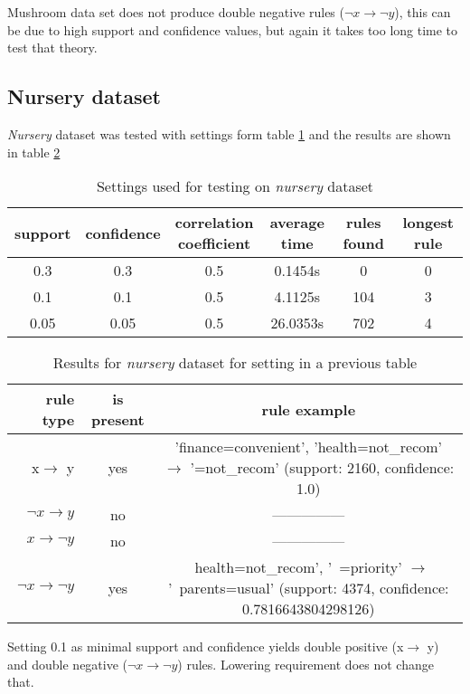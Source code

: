 \documentclass{article}
\begin{document}
	Mushroom data set does not produce double negative rules ($\neg x\rightarrow \neg y $), this can be due to high support and confidence values, but again it takes too long time to test that theory.
	
	\subsection{Nursery dataset}
	\textit{Nursery} dataset was tested with settings form table \ref{ns} and the results are shown in table \ref{nr}
	
	\begin{table}[H]
		\centering
		\label{ns}
		\begin{tabular}{c |c |c|c|c|c}
			support&confidence&\makecell{correlation\\coefficient}&average time&rules found&longest rule\\
			\hline
			\hline
			0.3&0.3&0.5&0.1454s&0&0\\
			\hline
			0.1&0.1&0.5&4.1125s&104&3\\
			\hline
			0.05&0.05&0.5&26.0353s&702&4\\
		\end{tabular}
		\caption{Settings used for testing on \textit{nursery} dataset}
	\end{table}
	\begin{table}[H]
		\centering
		\label{nr}
		\begin{tabular}{r|c |c}
			rule type& is present & rule example\\
			\hline
			\hline
			x$\rightarrow$ y & yes &\makecell{'finance=convenient', 'health=not\_recom' $\rightarrow$\\ '=not\_recom'\\ (support: 2160, confidence: 1.0)} \\
			\hline
			$\neg x\rightarrow y$ & no &---------------\\
			\hline
			$x\rightarrow \neg y $& no &---------------\\
			\hline
			$\neg x\rightarrow \neg y $& yes &\makecell{~health=not\_recom', '~=priority' $\rightarrow$\\ '~parents=usual'\\ (support: 4374, confidence: 0.7816643804298126)} \\ 
		\end{tabular}
		\caption{Results for \textit{nursery} dataset for setting in a previous table}
	\end{table}
	Setting 0.1 as minimal support and confidence yields double positive (x$\rightarrow$ y) and double negative ($\neg x\rightarrow \neg y $) rules. Lowering requirement does not change that.
	
\end{document}
